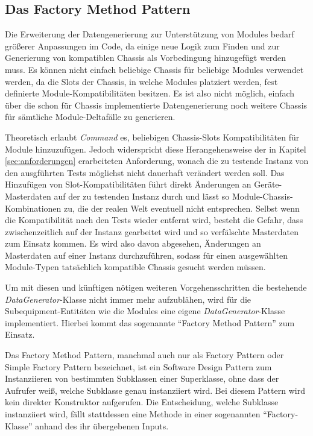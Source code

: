 \subsection{Das Factory Method Pattern}\label{subsec:factoryMethod}
Die Erweiterung der Datengenerierung zur Unterstützung von Modules bedarf größerer Anpassungen im Code, da einige neue Logik zum Finden und zur Generierung von kompatiblen Chassis als Vorbedingung hinzugefügt werden muss. Es können nicht einfach beliebige Chassis für beliebige Modules verwendet werden, da die Slots der Chassis, in welche Modules platziert werden, fest definierte Module-Kompatibilitäten besitzen. Es ist also nicht möglich, einfach über die schon für Chassis implementierte Datengenerierung noch weitere Chassis für sämtliche Module-Deltafälle zu generieren. 

Theoretisch erlaubt \textit{Command} es, beliebigen Chassis-Slots Kompatibilitäten für Module hinzuzufügen. Jedoch widerspricht diese Herangehensweise der in Kapitel \ref{sec:anforderungen} erarbeiteten Anforderung, wonach die zu testende Instanz von den ausgführten Tests möglichst nicht dauerhaft verändert werden soll. Das Hinzufügen von Slot-Kompatibilitäten führt direkt Änderungen an Geräte-Masterdaten auf der zu testenden Instanz durch und lässt so Module-Chassis-Kombinationen zu, die der realen Welt eventuell nicht entsprechen. Selbst wenn die Kompatibilität nach den Tests wieder entfernt wird, besteht die Gefahr, dass zwischenzeitlich auf der Instanz gearbeitet wird und so verfälschte Masterdaten zum Einsatz kommen. Es wird also davon abgesehen, Änderungen an Masterdaten auf einer Instanz durchzuführen, sodass für einen ausgewählten Module-Typen tatsächlich kompatible Chassis gesucht werden müssen.

Um mit diesen und künftigen nötigen weiteren Vorgehensschritten die bestehende \textit{DataGenerator}-Klasse nicht immer mehr aufzublähen, wird für die Subequipment-Entitäten wie die Modules eine eigene \textit{DataGenerator}-Klasse implementiert. Hierbei kommt das sogenannte \enquote{Factory Method Pattern} zum Einsatz.

Das Factory Method Pattern, manchmal auch nur als Factory Pattern oder Simple Factory Pattern bezeichnet, ist ein Software Design Pattern zum Instanziieren von bestimmten Subklassen einer Superklasse, ohne dass der Aufrufer weiß, welche Subklasse genau instanziiert wird. \cite[S. 168]{metsker:2006} \cite[S. 22]{stelting:2002} Bei diesem Pattern wird kein direkter Konstruktor aufgerufen. Die Entscheidung, welche Subklasse instanziiert wird, fällt stattdessen eine Methode in einer sogenannten \enquote{Factory-Klasse} anhand des ihr übergebenen Inputs. \cite[S. 19f.]{cooper:2000}

